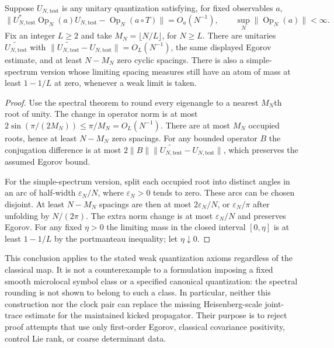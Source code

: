 \begin{proposition}
Suppose $U_{N,\mathrm{test}}$ is any unitary quantization satisfying, for fixed observables $a$,
\[
 \|U_{N,\mathrm{test}}^*\operatorname{Op}_N(a)U_{N,\mathrm{test}}-\operatorname{Op}_N(a\circ T)\|
       =O_a(N^{-1}),\qquad \sup_N\|\operatorname{Op}_N(a)\|<\infty.
\]
Fix an integer $L\ge2$ and take $M_N=\lfloor N/L\rfloor$, for $N\ge L$.
There are unitaries $\widetilde{U_{N,\mathrm{test}}}$ with
$\|\widetilde{U_{N,\mathrm{test}}}-U_{N,\mathrm{test}}\|=O_L(N^{-1})$, the same displayed Egorov estimate,
and at least $N-M_N$ zero cyclic spacings. There is also a simple-spectrum
version whose limiting spacing measures still have an atom of mass at least
$1-1/L$ at zero, whenever a weak limit is taken.
\end{proposition}
\begin{proof}
Use the spectral theorem to round every eigenangle to a nearest $M_N$th
root of unity. The change in operator norm is at most
$2\sin(\pi/(2M_N))\le\pi/M_N=O_L(N^{-1})$.
There are at most $M_N$ occupied roots, hence at least $N-M_N$ zero spacings.
For any bounded operator $B$ the conjugation difference is at most
$2\|B\|\|\widetilde{U_{N,\mathrm{test}}}-U_{N,\mathrm{test}}\|$, which preserves the assumed Egorov bound.

For the simple-spectrum version, split each occupied root into distinct
angles in an arc of half-width $\varepsilon_N/N$, where
$\varepsilon_N>0$ tends to zero. These arcs can be chosen disjoint.
At least $N-M_N$ spacings are then at most
$2\varepsilon_N/N$, or $\varepsilon_N/\pi$ after unfolding by $N/(2\pi)$.
The extra norm change is at most $\varepsilon_N/N$ and preserves Egorov.
For any fixed $\eta>0$ the limiting mass in the closed interval $[0,\eta]$
is at least $1-1/L$ by the portmanteau inequality; let $\eta\downarrow0$.
\end{proof}

This conclusion applies to the stated weak quantization axioms regardless of
the classical map. It is not a counterexample to a formulation imposing a
fixed smooth microlocal symbol class or a specified canonical quantization:
the spectral rounding is not shown to belong to such a class. In particular,
neither this construction nor the clock pair can replace the missing
Heisenberg-scale joint-trace estimate for the maintained kicked propagator.
Their purpose is to reject proof attempts that use only first-order Egorov,
classical covariance positivity, control Lie rank, or coarse determinant data.


